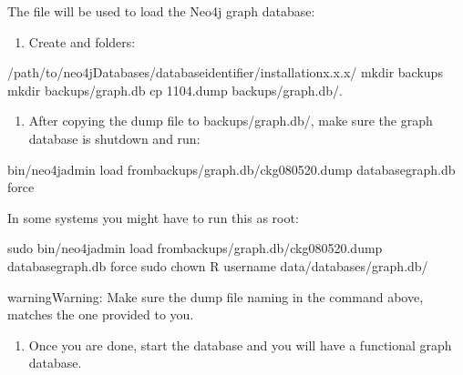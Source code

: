 \documentclass[letterpaper,10pt,english]{sphinxmanual}
\begin{document}
The  file will be used to load the Neo4j graph database:
\begin{enumerate}
%
\item {} 
Create  and  folders:

\end{enumerate}

\begin{sphinxVerbatim}[commandchars=\\\{\}]
\PYGZdl{}  /path/to/neo4jDatabases/database\PYGZhy{}identifier/installation\PYGZhy{}x.x.x/
\PYGZdl{} mkdir backups
\PYGZdl{} mkdir backups/graph.db
\PYGZdl{} cp \PYGZhy{}11\PYGZhy{}04.dump backups/graph.db/.
\end{sphinxVerbatim}
\begin{enumerate}
%
\setcounter{enumi}{1}
\item {} 
After copying the dump file to backups/graph.db/, make sure the graph database is shutdown and run:

\end{enumerate}

\begin{sphinxVerbatim}[commandchars=\\\{\}]
\PYGZdl{} bin/neo4j\PYGZhy{}admin load \PYGZhy{}\PYGZhy{}frombackups/graph.db/ckg\PYGZus{}080520.dump \PYGZhy{}\PYGZhy{}databasegraph.db \PYGZhy{}\PYGZhy{}force
\end{sphinxVerbatim}

In some systems you might have to run this as root:

\begin{sphinxVerbatim}[commandchars=\\\{\}]
\PYGZdl{} sudo bin/neo4j\PYGZhy{}admin load \PYGZhy{}\PYGZhy{}frombackups/graph.db/ckg\PYGZus{}080520.dump \PYGZhy{}\PYGZhy{}databasegraph.db \PYGZhy{}\PYGZhy{}force
\PYGZdl{} sudo chown \PYGZhy{}R username data/databases/graph.db/
\end{sphinxVerbatim}

\begin{sphinxadmonition}{warning}{Warning:}
Make sure the dump file naming in the command above, matches the one provided to you.
\end{sphinxadmonition}
\begin{enumerate}
%
\setcounter{enumi}{2}
\item {} 
Once you are done, start the database and you will have a functional graph database.

\end{enumerate}
\end{document}
